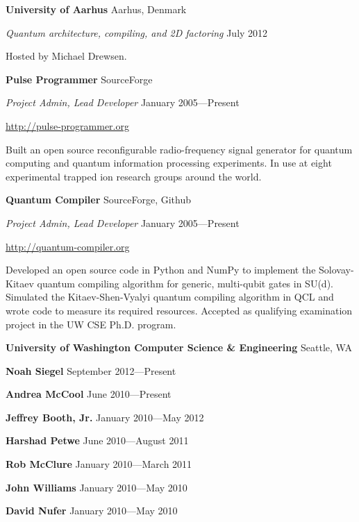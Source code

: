 \documentclass[letter]{article}
\begin{document}
\vspace{\baselineskip}
\par
{\bf {University of Aarhus}} \hfill Aarhus, Denmark
\par
{\em Quantum architecture, compiling, and 2D factoring} \hfill July 2012
\par
Hosted by Michael Drewsen.

\vspace{\baselineskip}
\par
{\bf {Pulse Programmer}} \hfill SourceForge
\par
{\em Project Admin, Lead Developer} \hfill January 2005---Present
\par
\url{http://pulse-programmer.org}
\par
Built an open source reconfigurable radio-frequency signal generator
for quantum computing and quantum information processing experiments.
In use at eight experimental trapped ion research groups around the world.

\vspace{\baselineskip}
\par
{\bf {Quantum Compiler}} \hfill SourceForge, Github
\par
{\em Project Admin, Lead Developer} \hfill January 2005---Present
\par
\url{http://quantum-compiler.org}
\par
Developed an open source code in Python and NumPy to implement the
Solovay-Kitaev quantum compiling algorithm for generic, multi-qubit gates
in SU(d). Simulated the Kitaev-Shen-Vyalyi quantum compiling algorithm in
QCL and wrote code to measure its required resources. Accepted as
qualifying examination project in the UW CSE Ph.D. program.

\vspace{\baselineskip}
\par
{\bf {University of Washington Computer Science \& Engineering}} \hfill Seattle, WA
\par
{\bf Noah Siegel} \hfill September 2012---Present
\par
{\bf Andrea McCool} \hfill June 2010---Present
\par
{\bf Jeffrey Booth, Jr.} \hfill January 2010---May 2012
\par
{\bf Harshad Petwe} \hfill June 2010---August 2011
\par
{\bf Rob McClure} \hfill January 2010---March 2011
\par
{\bf John Williams} \hfill January 2010---May 2010
\par
{\bf David Nufer} \hfill January 2010---May 2010
\end{document}
